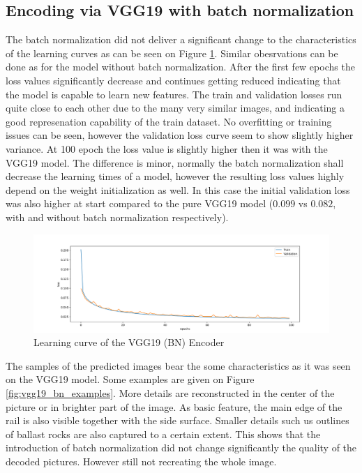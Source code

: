 \subsection{Encoding via VGG19 with batch normalization}
The batch normalization did not deliver a significant change to the characteristics of the learning
curves as can be seen on Figure \ref{fig:vgg19_bn_learning_curve}.
Similar obesrvations can be done as for the model without batch normalization.
After the first few epochs the loss values significantly decrease and continues getting reduced
indicating that the model is capable to learn new features.
The train and validation losses run quite close to each other due to the many very similar images,
and indicating a good represenation capability of the train dataset.
No overfitting or training issues can be seen, however the validation loss curve seem to show
slightly higher variance.
At 100 epoch the loss value is slightly higher then it was with the VGG19 model.
The difference is minor, normally the batch normalization shall decrease the learning times of a model,
however the resulting loss values highly depend on the weight initialization as well.
In this case the initial validation loss was also higher at start compared to the pure VGG19 model
($0.099$ vs $0.082$, with and without batch normalization respectively).

\begin{figure}[!ht]
    \centering
    \includegraphics[width=\textwidth,trim={0 0 0 1cm},clip]{./results/vgg19_bn_vgg19/20230525_045131_results.png}
    \caption{Learning curve of the VGG19 (BN) Encoder}
    \label{fig:vgg19_bn_learning_curve}
\end{figure}

The samples of the predicted images bear the some characteristics as it was seen on the VGG19 model.
Some examples are given on Figure \ref{fig:vgg19_bn_examples}.
More details are reconstructed in the center of the picture or in brighter part of the image.
As basic feature, the main edge of the rail is also visible together with the side surface.
Smaller details such us outlines of ballast rocks are also captured to a certain extent.
This shows that the introduction of batch normalization did not change significantly the quality of
the decoded pictures.
However still not recreating the whole image.

